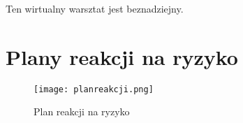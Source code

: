 Ten wirtualny warsztat jest beznadziejny.


\section{Plany reakcji na ryzyko}

\begin{figure}[!h]
\begin{center}
\texttt{[image: planreakcji.png]}
\caption[Plan reakcji na ryzyko]{Plan reakcji na ryzyko}
\label{rysunekProces}
\end{center}
\end{figure}


